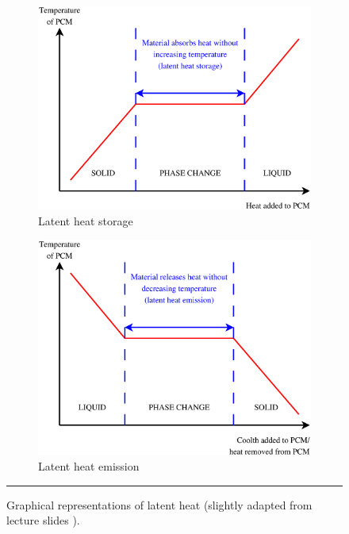 \begin{figure}[htbp]
	\centering
	\begin{subfigure}{.49\textwidth}
		\centering
		\includegraphics[width=\textwidth]{figures/LatentHeatStorage.eps}
		\caption{Latent heat storage}
		\label{fig:latentheatstorage}
	\end{subfigure}
	\begin{subfigure}{.47\textwidth}
		\centering
		\includegraphics[width=\textwidth]{figures/LatentHeatEmission.eps}
		\caption{Latent heat emission}
		\label{fig:latentheatemission}
	\end{subfigure}
	\rule{\textwidth}{0.5pt} %
	\caption[Graphical representations of latent heat.]{Graphical representations of latent heat (slightly adapted from \EnBldgsTitle \space lecture slides \citep{jenkins}).}
	\label{fig:latentheat}
\end{figure}


